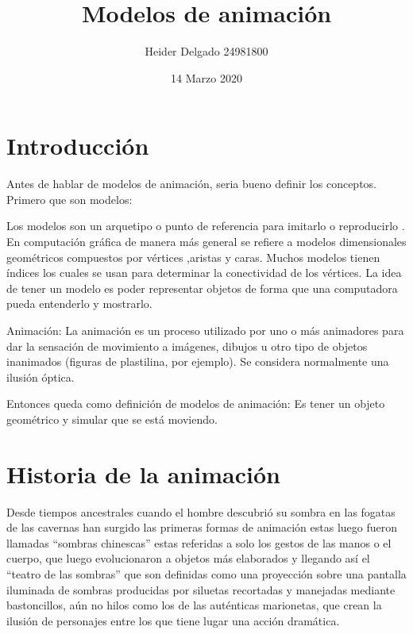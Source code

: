 \documentclass[a4paper,12pt]{report}
\begin{document}
 
\let\cleardoublepage\clearpage
 
\title{\Large{\textbf{Modelos de animación}}}
\author{Heider Delgado 24981800}
\date{14 Marzo 2020}
 
\maketitle
 
\tableofcontents
 

\thispagestyle{empty}
 
 
\renewcommand{\headrulewidth}{2pt}
\renewcommand{\footrulewidth}{1pt}

\newpage
{}
\chapter*{Introducción}
 
 
Antes de hablar de modelos de animación, seria bueno definir los conceptos. 
Primero que son modelos: 
 
Los modelos son un arquetipo o punto de referencia para imitarlo
o reproducirlo
\cite{modelo}.
En computación gráfica de manera más general se refiere
a modelos dimensionales geométricos compuestos por vértices
,aristas y caras. 
Muchos modelos tienen índices los cuales se usan para determinar 
la conectividad de los vértices. 
La idea de tener un modelo es poder representar
objetos de forma que una computadora pueda entenderlo y mostrarlo.
 
 
Animación: La animación es un proceso utilizado por uno o
más animadores para dar la sensación de movimiento
a imágenes, dibujos u otro tipo de objetos inanimados 
(figuras de plastilina, por ejemplo). 
Se considera normalmente una ilusión óptica.\cite{animacion}
 
Entonces queda como definición de modelos de animación: 
Es tener un objeto geométrico y simular que se está moviendo.
 
 
\setcounter{page}{1}
\newpage
 
\chapter{Historia de la animación}
 
Desde tiempos ancestrales cuando el hombre descubrió su sombra en las fogatas de las cavernas
han surgido las primeras formas de animación estas luego fueron llamadas ``sombras chinescas''
estas referidas a solo los gestos de las manos o el cuerpo, 
que luego evolucionaron a objetos más elaborados y llegando así el ``teatro de las sombras'' que son
definidas como una proyección sobre una pantalla iluminada de sombras producidas por siluetas recortadas y manejadas mediante bastoncillos, aún no hilos como los de las
auténticas marionetas, que crean la ilusión de personajes entre los que tiene lugar una acción dramática.\cite{sombras_chinescas}
 
\end{document}
